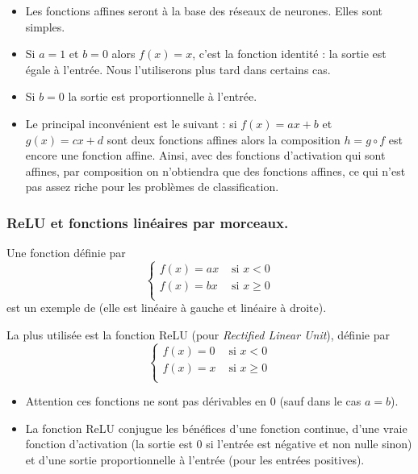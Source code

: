 \documentclass[11pt,class=report,crop=false]{standalone}
\begin{document}
\begin{remarque*}
  \sauteligne
\begin{itemize}
  \item Les fonctions affines seront à la base des réseaux de neurones. Elles sont simples.
  \item Si $a=1$ et $b=0$ alors $f(x)=x$, c'est la fonction identité : la sortie est égale à l'entrée. Nous l'utiliserons plus tard dans certains cas.
  \item Si $b=0$ la sortie est proportionnelle à l'entrée.
  \item Le principal inconvénient est le suivant : si $f(x) = ax+b$ et $g(x)=cx+d$ sont deux fonctions affines alors la composition $h = g\circ f$ est encore une fonction affine. Ainsi, avec des fonctions d'activation qui sont affines, par composition on n'obtiendra que des fonctions affines, ce qui n'est pas assez riche pour les problèmes de classification.
  
  
\end{itemize}
\end{remarque*}



\bigskip
\subsubsection{ReLU et fonctions linéaires par morceaux.}

Une fonction définie par 
$$\begin{cases}
f(x) = ax & \text{ si } x < 0 \\
f(x) = bx  & \text{ si } x \ge 0 \\
\end{cases}$$
est un exemple de  (elle est linéaire à gauche et linéaire à droite). 


La plus utilisée est la fonction ReLU (pour \emph{Rectified Linear Unit}),
définie par 
$$\begin{cases}
f(x) = 0 & \text{ si } x < 0 \\
f(x) = x  & \text{ si } x \ge 0 \\
\end{cases}$$



\begin{remarque*}
  \sauteligne
\begin{itemize}
  \item Attention ces fonctions ne sont pas dérivables en $0$ (sauf dans le cas $a=b$).
  \item La fonction ReLU conjugue les bénéfices d'une fonction continue, d'une vraie fonction d'activation (la sortie est $0$ si l'entrée est négative et non nulle sinon) et d'une sortie proportionnelle à l'entrée (pour les entrées positives).
\end{itemize}
\end{remarque*}
\end{document}
